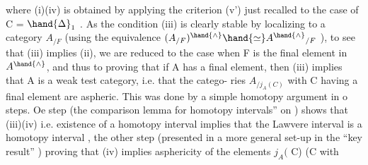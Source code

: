 where (i)\hand{$\Rightarrow$}(iv) is obtained by applying the criterion (v') just recalled
to the case of  C = $\hand{\Delta}_1$ .  As the condition (iii) is clearly stable by
localizing to a category $A_{/F}$  (using  the equivalence  $(A_{/F})^{\hand{\wedge}} \hand{\simeq} A^{\hand{\wedge}}{}_{/F}$ ), to
see that (iii) implies (ii),  we are reduced  to the case when F is the
final element in $A^{\hand{\wedge}}$,  and thus to proving that if A  has a final element,
then (iii) implies that A is a weak test category,  i.e. that the catego-%
ries  $A_{/j_A(C)}$ \hand{,} with C  having a final element\hand{,}  are aspheric.
This was done by a simple  homotopy argument  in 
o steps.  Oe step  (the comparison lemma for homotopy intervals''
on )  shows that (iii)\hand{$\Rightarrow$}(iv)  i.e. existence of a homotopy interval
implies that the Lawvere interval is a homotopy interval ,  the other
step  (presented in a more general set-up in the ``key result''  )
proving that (iv)  implies asphericity of the elements $j_A($ C)  (C with
